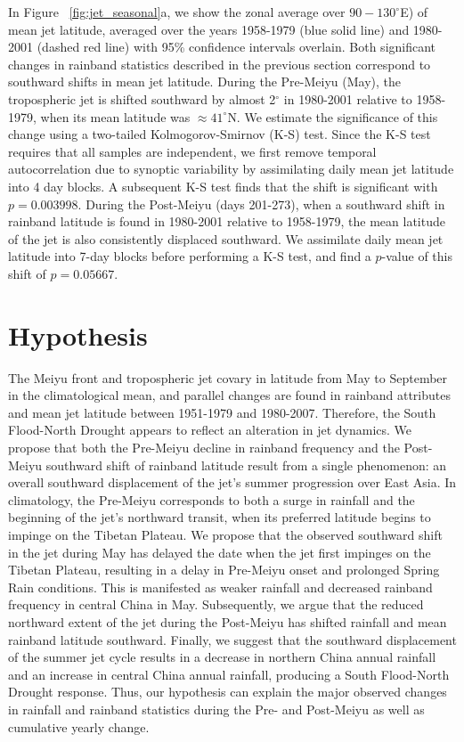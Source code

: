 	In Figure ~\ref{fig:jet_seasonal}a, we show the zonal average over $90-130^\circ$E) of mean jet latitude, averaged over the years 1958-1979 (blue solid line) and 1980-2001 (dashed red line) with 95\% confidence intervals overlain. Both significant changes in rainband statistics described in the previous section correspond to southward shifts in mean jet latitude. During the Pre-Meiyu (May), the tropospheric jet is shifted southward by almost 2$^{\circ}$ in 1980-2001 relative to 1958-1979, when its mean latitude was $\approx 41^{\circ}$N. We estimate the significance of this change using a two-tailed Kolmogorov-Smirnov (K-S) test. Since the K-S test requires that all samples are independent, we first remove temporal autocorrelation due to synoptic variability by assimilating daily mean jet latitude into 4 day blocks. A subsequent K-S test finds that the shift is significant with $p=0.003998$. During the Post-Meiyu (days 201-273), when a southward shift in rainband latitude is found in 1980-2001 relative to 1958-1979, the mean latitude of the jet is also consistently displaced southward. We assimilate daily mean jet latitude into 7-day blocks before performing a K-S test, and find a $p$-value of this shift of $p=0.05667$.
	
\section{Hypothesis}

	The Meiyu front and tropospheric jet covary in latitude from May to September in the climatological mean, and parallel changes are found in rainband attributes and mean jet latitude between 1951-1979 and 1980-2007. Therefore, the South Flood-North Drought appears to reflect an alteration in jet dynamics. We propose that both the Pre-Meiyu decline in rainband frequency and the Post-Meiyu southward shift of rainband latitude result from a single phenomenon: an overall southward displacement of the jet's summer progression over East Asia. In climatology, the Pre-Meiyu corresponds to both a surge in rainfall and the beginning of the jet's northward transit, when its preferred latitude begins to impinge on the Tibetan Plateau. We propose that the observed southward shift in the jet during May has delayed the date when the jet first impinges on the Tibetan Plateau, resulting in a delay in Pre-Meiyu onset and prolonged Spring Rain conditions. This is manifested as weaker rainfall and decreased rainband frequency in central China in May. Subsequently, we argue that the reduced northward extent of the jet during the Post-Meiyu has shifted rainfall and mean rainband latitude southward. Finally, we suggest that the southward displacement of the summer jet cycle results in a decrease in northern China annual rainfall and an increase in central China annual rainfall, producing a South Flood-North Drought response. Thus, our hypothesis can explain the major observed changes in rainfall and rainband statistics during the Pre- and Post-Meiyu as well as cumulative yearly change.
	
